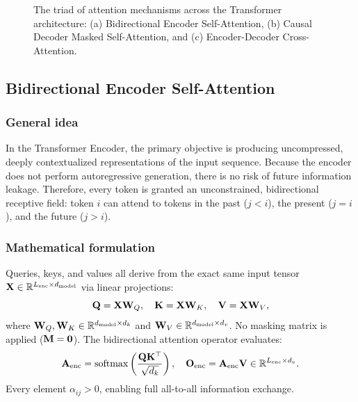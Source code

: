 \documentclass[../../../main.tex]{subfiles}
\begin{document}
\begin{figure}[htbp]
{\begin{tikzpicture}
\end{tikzpicture}%
}
\caption{The triad of attention mechanisms across the Transformer architecture: (a) Bidirectional Encoder Self-Attention, (b) Causal Decoder Masked Self-Attention, and (c) Encoder-Decoder Cross-Attention.}
\label{fig:attention_triad_types_ch5}
\end{figure}

\subsection{Bidirectional Encoder Self-Attention}
\label{subsec:bidirectional_encoder_self_attn}

\subsubsection{General idea}
In the Transformer Encoder, the primary objective is producing uncompressed, deeply contextualized representations of the input sequence. Because the encoder does not perform autoregressive generation, there is no risk of future information leakage. Therefore, every token is granted an unconstrained, bidirectional receptive field: token $i$ can attend to tokens in the past ($j < i$), the present ($j = i$), and the future ($j > i$).

\subsubsection{Mathematical formulation}
Queries, keys, and values all derive from the exact same input tensor $\mathbf{X} \in \mathbb{R}^{L_{\text{enc}} \times d_{\text{model}}}$ via linear projections:
\begin{equation}
\label{eq:encoder_attn_projections_ch5}
\mathbf{Q} = \mathbf{X} \mathbf{W}_Q, \quad \mathbf{K} = \mathbf{X} \mathbf{W}_K, \quad \mathbf{V} = \mathbf{X} \mathbf{W}_V,
\end{equation}
where $\mathbf{W}_Q, \mathbf{W}_K \in \mathbb{R}^{d_{\text{model}} \times d_k}$ and $\mathbf{W}_V \in \mathbb{R}^{d_{\text{model}} \times d_v}$. No masking matrix is applied ($\mathbf{M} = \mathbf{0}$). The bidirectional attention operator evaluates:
\begin{equation}
\label{eq:bidirectional_attention_formula}
\mathbf{A}_{\text{enc}} = \operatorname{\mathrm{softmax}}\left( \frac{\mathbf{Q} \mathbf{K}^\top}{\sqrt{d_k}} \right), \quad \mathbf{O}_{\text{enc}} = \mathbf{A}_{\text{enc}} \mathbf{V} \in \mathbb{R}^{L_{\text{enc}} \times d_v}.
\end{equation}
Every element $\alpha_{ij} > 0$, enabling full all-to-all information exchange.
\end{document}
